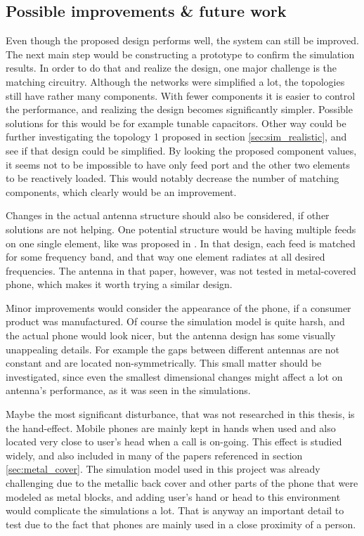\subsection{Possible improvements \& future work}
\label{sec:improvements}
Even though the proposed design performs well, the system can still be improved. The next main step would be constructing a prototype to confirm the simulation results. In order to do that and realize the design, one major challenge is the matching circuitry. Although the networks were simplified a lot, the topologies still have rather many components. With fewer components it is easier to control the performance, and realizing the design becomes significantly simpler. Possible solutions for this would be for example tunable capacitors. Other way could be further investigating the topology 1 proposed in section \ref{sec:sim_realistic}, and see if that design could be simplified. By looking the proposed component values, it seems not to be impossible to have only feed port and the other two elements to be reactively loaded. This would notably decrease the number of matching components, which clearly would be an improvement.

Changes in the actual antenna structure should also be considered, if other solutions are not helping. One potential structure would be having multiple feeds on one single element, like was proposed in \cite{valkonen_multifeed}. In that design, each feed is matched for some frequency band, and that way one element radiates at all desired frequencies. The antenna in that paper, however, was not tested in metal-covered phone, which makes it worth trying a similar design.

Minor improvements would consider the appearance of the phone, if a consumer product was manufactured. Of course the simulation model is quite harsh, and the actual phone would look nicer, but the antenna design has some visually unappealing details. For example the gaps between different antennas are not constant and are located non-symmetrically. This small matter should be investigated, since even the smallest dimensional changes might affect a lot on antenna's performance, as it was seen in the simulations.

Maybe the most significant disturbance, that was not researched in this thesis, is the hand-effect. Mobile phones are mainly kept in hands when used and also located very close to user's head when a call is on-going. This effect is studied widely, and also included in many of the papers referenced in section \ref{sec:metal_cover}. The simulation model used in this project was already challenging due to the metallic back cover and other parts of the phone that were modeled as metal blocks, and adding user's hand or head to this environment would complicate the simulations a lot. That is anyway an important detail to test due to the fact that phones are mainly used in a close proximity of a person.


\clearpage